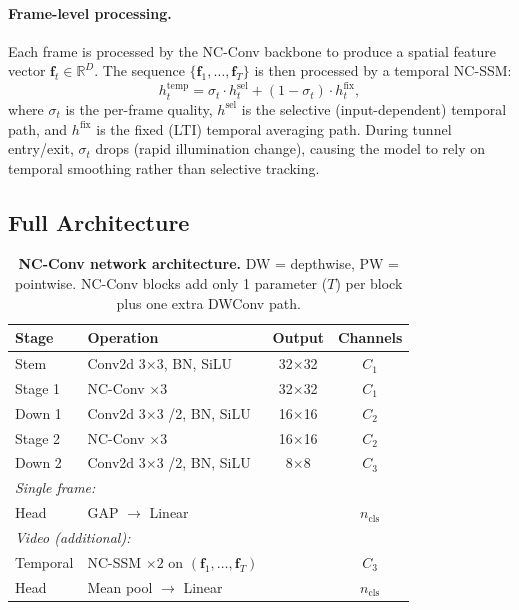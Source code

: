 \documentclass[10pt,twocolumn,letterpaper]{article}
\begin{document}
\paragraph{Frame-level processing.}
Each frame is processed by the NC-Conv backbone to produce a spatial feature vector $\mathbf{f}_t \in \mathbb{R}^D$.
The sequence $\{\mathbf{f}_1, \ldots, \mathbf{f}_T\}$ is then processed by a temporal NC-SSM:
\begin{equation}
h_t^{\text{temp}} = \sigma_t \cdot h_t^{\text{sel}} + (1-\sigma_t) \cdot h_t^{\text{fix}},
\end{equation}
where $\sigma_t$ is the per-frame quality, $h^{\text{sel}}$ is the selective (input-dependent) temporal path, and $h^{\text{fix}}$ is the fixed (LTI) temporal averaging path.
During tunnel entry/exit, $\sigma_t$ drops (rapid illumination change), causing the model to rely on temporal smoothing rather than selective tracking.


\subsection{Full Architecture}

\begin{table}[t]
\centering
\caption{\textbf{NC-Conv network architecture.} DW = depthwise, PW = pointwise. NC-Conv blocks add only 1 parameter ($T$) per block plus one extra DWConv path.}
\label{tab:arch}
\setlength{\tabcolsep}{3pt}
\footnotesize
\begin{tabular}{@{}llcc@{}}
\toprule
\textbf{Stage} & \textbf{Operation} & \textbf{Output} & \textbf{Channels} \\
\midrule
Stem & Conv2d 3$\times$3, BN, SiLU & 32$\times$32 & $C_1$ \\
Stage 1 & NC-Conv $\times 3$ & 32$\times$32 & $C_1$ \\
Down 1 & Conv2d 3$\times$3 /2, BN, SiLU & 16$\times$16 & $C_2$ \\
Stage 2 & NC-Conv $\times 3$ & 16$\times$16 & $C_2$ \\
Down 2 & Conv2d 3$\times$3 /2, BN, SiLU & 8$\times$8 & $C_3$ \\
\midrule
\multicolumn{4}{l}{\textit{Single frame:}} \\
Head & GAP $\to$ Linear & & $n_{\text{cls}}$ \\
\midrule
\multicolumn{4}{l}{\textit{Video (additional):}} \\
Temporal & NC-SSM $\times 2$ on $(\mathbf{f}_1,\ldots,\mathbf{f}_T)$ & & $C_3$ \\
Head & Mean pool $\to$ Linear & & $n_{\text{cls}}$ \\
\bottomrule
\end{tabular}
\end{table}
\end{document}
